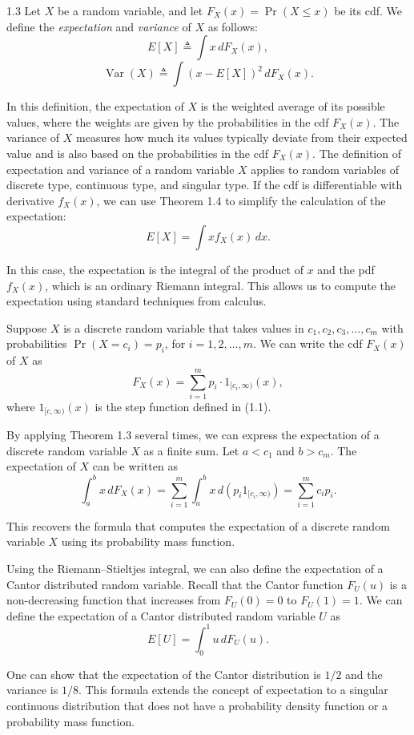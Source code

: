 \begin{defbox}{1.3}
Let $X$ be a random variable, and let $F_X(x)=\Pr(X\le x)$ be its cdf. We define the \textit{expectation} and \textit{variance} of $X$ as follows:
\[
E[X]\triangleq \int x\, dF_X(x),
\]
\[
\operatorname{Var}(X)\triangleq \int (x-E[X])^2\, dF_X(x).
\]

In this definition, the expectation of $X$ is the weighted average of its possible values, where the weights are given by the probabilities in the cdf $F_X(x)$. The variance of $X$ measures how much its values typically deviate from their expected value and is also based on the probabilities in the cdf $F_X(x)$. The definition of expectation and variance of a random variable $X$ applies to random variables of discrete type, continuous type, and singular type. If the cdf is differentiable with derivative $f_X(x)$, we can use Theorem 1.4 to simplify the calculation of the expectation:
\[
E[X]=\int x f_X(x)\, dx.
\]

In this case, the expectation is the integral of the product of $x$ and the pdf $f_X(x)$, which is an ordinary Riemann integral. This allows us to compute the expectation using standard techniques from calculus.
\end{defbox}

Suppose $X$ is a discrete random variable that takes values in $c_1,c_2,c_3,\dots,c_m$ with probabilities $\Pr(X=c_i)=p_i$, for $i=1,2,\dots,m$. We can write the cdf $F_X(x)$ of $X$ as
\[
F_X(x)=\sum_{i=1}^{m} p_i \cdot 1_{[c_i,\infty)}(x),
\]
where $1_{[c,\infty)}(x)$ is the step function defined in (1.1).

By applying Theorem 1.3 several times, we can express the expectation of a discrete random variable $X$ as a finite sum. Let $a<c_1$ and $b>c_m$. The expectation of $X$ can be written as
\[
\int_a^b x\, dF_X(x)
=
\sum_{i=1}^{m}\int_a^b x\, d(p_i1_{[c_i,\infty)})
=
\sum_{i=1}^{m} c_i p_i.
\]

This recovers the formula that computes the expectation of a discrete random variable $X$ using its probability mass function.

Using the Riemann--Stieltjes integral, we can also define the expectation of a Cantor distributed random variable. Recall that the Cantor function $F_U(u)$ is a non-decreasing function that increases from $F_U(0)=0$ to $F_U(1)=1$. We can define the expectation of a Cantor distributed random variable $U$ as
\[
E[U]=\int_0^1 u\, dF_U(u).
\]

One can show that the expectation of the Cantor distribution is $1/2$ and the variance is $1/8$. This formula extends the concept of expectation to a singular continuous distribution that does not have a probability density function or a probability mass function.

